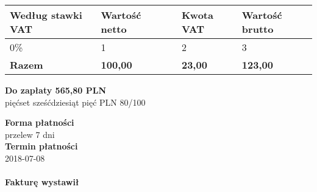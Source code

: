 \documentclass[a4paper,10pt]{article}
\begin{document}
    \begin{table}[H]
    \raggedleft
    \begin{tabular}{| p{} | p{} | p{} | p{} | p{} |}
    \hline
    \textbf{Według stawki VAT} & \textbf{Wartość netto} & \cellcolor[gray]{0.9} & \textbf{Kwota VAT} & \textbf{Wartość brutto} \\ \hline
  
    {0}\% & {1} & \cellcolor[gray]{0.9} & {2} & {3} \\ \hline
  
  \hline
  {\textbf{Razem}}  & \textbf{100,00} & \cellcolor[gray]{0.9} & \textbf{23,00} & \textbf{123,00} \\ \hline
  \end{tabular}
  \end{table}

  \noindent
  \begin{flushright}
  \textbf{\LARGE{Do zapłaty} 565,80 PLN}\\
  pięćset sześćdziesiąt pięć PLN 80/100
  \end{flushright}

  \vfill
  \noindent
  \textbf{Forma płatności}\\
  przelew 7 dni\\
  \textbf{Termin płatności}\\
  2018-07-08\\
  \\
  
  \noindent
    \textbf{Fakturę wystawił}\\
    
    
\end{document}
